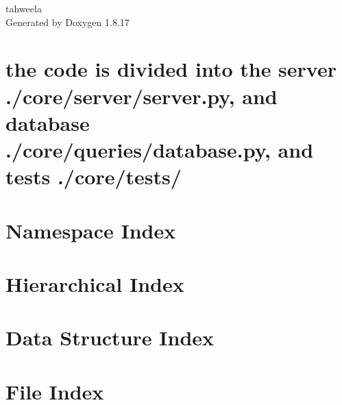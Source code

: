 \let\mypdfximage\pdfximage\def\pdfximage{\immediate\mypdfximage}\documentclass[twoside]{book}
\newcommand{\+}{\discretionary{\mbox{\scriptsize$\hookleftarrow$}}{}{}}
\newcommand{\clearemptydoublepage}{%
  \newpage{\pagestyle{empty}\cleardoublepage}%
}
\begin{document}
\hypersetup{pageanchor=false,
             bookmarksnumbered=true,
             pdfencoding=unicode
            }
\begin{titlepage}
\vspace*{7cm}
\begin{center}%
{\Large tahweela }\\
\vspace*{1cm}
{\large Generated by Doxygen 1.8.17}\\
\end{center}
\end{titlepage}
\clearemptydoublepage
{}
\tableofcontents
\clearemptydoublepage
{}
\hypersetup{pageanchor=true}

\chapter{the code is divided into the server ./core/server/server.py, and database ./core/queries/database.py, and tests ./core/tests/}
\label{md__r_e_a_d_m_e}

\chapter{Namespace Index}

\chapter{Hierarchical Index}

\chapter{Data Structure Index}

\chapter{File Index}

\end{document}
